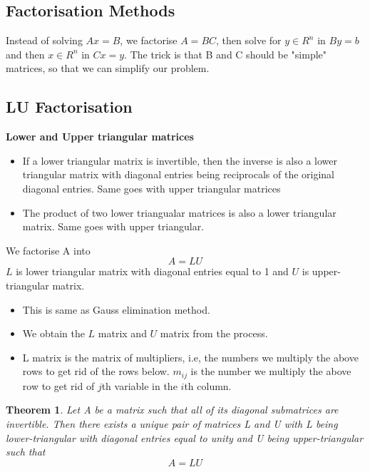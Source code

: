 \documentclass{article}
\newtheorem*{theorem}{Theorem}
\begin{document}
	\subsection*{Factorisation Methods}
		Instead of solving $Ax = B$, we factorise $A=BC$, then solve for $y\in R^n$ in $By = b$ and then $x\in R^n$ in $Cx = y$. The trick is that B and C should be "simple" matrices, so that we can simplify our problem.

	\subsection{LU Factorisation}

		\textbf{Lower and Upper triangular matrices}
		\begin{itemize}
			\item If a lower triangular matrix is invertible, then the inverse is also a lower triangular matrix with diagonal entries being reciprocals of the original diagonal entries. Same goes with upper triangular matrices
			\item The product of two lower triangualar matrices is also a lower triangular matrix. Same goes with upper triangular.
		\end{itemize}

		We factorise A into 
			\[A = LU\]
		$L$ is lower triangular matrix with diagonal entries equal to 1 and $U$ is upper-triangular matrix.

		\begin{itemize}
			\item This is same as Gauss elimination method.
			\item We obtain the $L$ matrix and $U$ matrix from the process. 
			\item L matrix is the matrix of multipliers, i.e, the numbers we multiply the above rows to get rid of the rows below. $m_{ij}$ is the number we multiply the above row to get rid of $j$th variable in the $i$th column.
		\end{itemize}

		\begin{theorem}
		Let A be a matrix such that all of its diagonal submatrices are invertible. Then there {exists} a unique pair of matrices L and U with L being lower-triangular with diagonal entries equal to unity and U being upper-triangular such that
		\[A= LU\]
		\end{theorem}
\end{document}
